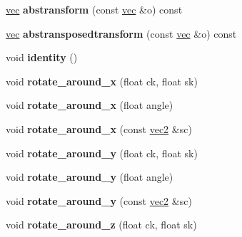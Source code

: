 \begin{DoxyCompactItemize}
\item 
\mbox{\label{structmatrix3_a445540c928c0c510f8d90cbbed022d62}} 
\hyperlink{structvec}{vec} {\bfseries abstransform} (const \hyperlink{structvec}{vec} \&o) const
\item 
\mbox{\label{structmatrix3_aa09bd3683fbfa8e9eb0af47fc25c9f08}} 
\hyperlink{structvec}{vec} {\bfseries abstransposedtransform} (const \hyperlink{structvec}{vec} \&o) const
\item 
\mbox{\label{structmatrix3_a64df5fd0717bdfd4f6357570810775e7}} 
void {\bfseries identity} ()
\item 
\mbox{\label{structmatrix3_a6b29d4355334ead3e43cef1965d37260}} 
void {\bfseries rotate\+\_\+around\+\_\+x} (float ck, float sk)
\item 
\mbox{\label{structmatrix3_a5a2fb2cc1bc9f4f6e0e37efb0178071f}} 
void {\bfseries rotate\+\_\+around\+\_\+x} (float angle)
\item 
\mbox{\label{structmatrix3_aa9ee52a37dedb7274cf417c3b80dadc5}} 
void {\bfseries rotate\+\_\+around\+\_\+x} (const \hyperlink{structvec2}{vec2} \&sc)
\item 
\mbox{\label{structmatrix3_a5f96243dfd75d2c38cf000004008af8a}} 
void {\bfseries rotate\+\_\+around\+\_\+y} (float ck, float sk)
\item 
\mbox{\label{structmatrix3_a3149678da441ea68f86691bd815bc1d7}} 
void {\bfseries rotate\+\_\+around\+\_\+y} (float angle)
\item 
\mbox{\label{structmatrix3_af96633ad982c5dd437f0b94fe56e9aac}} 
void {\bfseries rotate\+\_\+around\+\_\+y} (const \hyperlink{structvec2}{vec2} \&sc)
\item 
\mbox{\label{structmatrix3_a2a07d8dd167c27b65173bc0114f8998e}} 
void {\bfseries rotate\+\_\+around\+\_\+z} (float ck, float sk)
\item 
\mbox{\label{structmatrix3_a6e69e571c42788f5571c04788fbaa372}} 

\end{DoxyCompactItemize}
